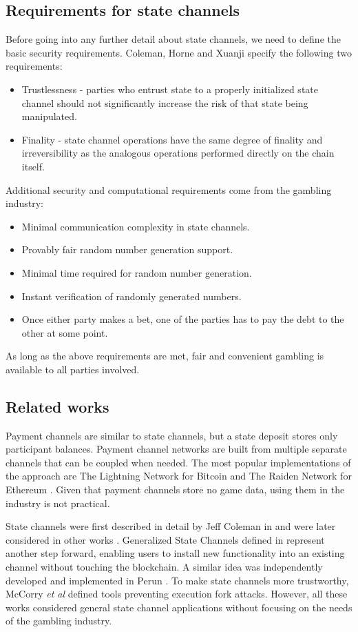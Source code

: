 		\subsection {Requirements for state channels}
	Before going into any further detail about state channels, we need to define the basic security requirements. Coleman, Horne and Xuanji \cite{bib1} specify the following two requirements:
	\begin{itemize}
		\item Trustlessness - parties who entrust state to a properly initialized state channel should not significantly increase the risk of that state being manipulated. 
		\item Finality - state channel operations have the same degree of finality and irreversibility as the analogous operations performed directly on the chain itself.
	\end{itemize}
	Additional security and computational requirements come from the gambling industry:
	\begin{itemize}
		\item Minimal communication complexity in state channels.
		\item Provably fair random number generation support.
		\item Minimal time required for random number generation.
		\item Instant verification of randomly generated numbers.
		\item Once either party makes a bet, one of the parties has to pay the debt to the other at some point. 
	\end{itemize}

	As long as the above requirements are met, fair and convenient gambling is available to all parties involved.

		\subsection {Related works} 
	Payment channels \cite{bib11} are similar to state channels, but a state deposit stores only participant balances. Payment channel networks are built from multiple separate channels that can be coupled when needed. The most popular implementations of the approach are The Lightning Network for Bitcoin \cite{bib24} and The Raiden Network for Ethereum \cite{bib25}. Given that payment channels store no game data, using them in the industry is not practical. 

	State channels were first described in detail by Jeff Coleman in \cite{bib5} and were later considered in other works \cite{bib6, bib7, bib8}. Generalized State Channels defined in \cite{bib1} represent another step forward, enabling users to install new functionality into an existing channel without touching the blockchain. A similar idea was independently developed and implemented in Perun \cite{bib14}. To make state channels more trustworthy, McCorry \textit {et al} \cite{bib9} defined tools preventing execution fork attacks. However, all these works considered general state channel applications without focusing on the needs of the gambling industry.

